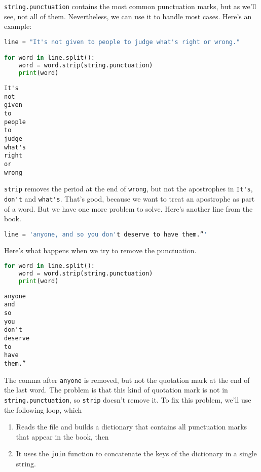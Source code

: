 \passthrough{\lstinline!string.punctuation!} contains the most common
punctuation marks, but as we'll see, not all of them. Nevertheless, we
can use it to handle most cases. Here's an example:

\begin{lstlisting}[language=Python,style=source]
line = "It's not given to people to judge what's right or wrong."

for word in line.split():
    word = word.strip(string.punctuation)
    print(word)
\end{lstlisting}

\begin{lstlisting}[style=output]
It's
not
given
to
people
to
judge
what's
right
or
wrong
\end{lstlisting}

\passthrough{\lstinline!strip!} removes the period at the end of
\passthrough{\lstinline!wrong!}, but not the apostrophes in
\passthrough{\lstinline!It's!}, \passthrough{\lstinline!don't!} and
\passthrough{\lstinline!what's!}. That's good, because we want to treat
an apostrophe as part of a word.
But we have one more problem to solve. Here's another line from the book.

\begin{lstlisting}[language=Python,style=source]
line = 'anyone, and so you don't deserve to have them.”'
\end{lstlisting}

Here's what happens when we try to remove the punctuation.

\begin{lstlisting}[language=Python,style=source]
for word in line.split():
    word = word.strip(string.punctuation)
    print(word)
\end{lstlisting}

\begin{lstlisting}[style=output]
anyone
and
so
you
don't
deserve
to
have
them.”
\end{lstlisting}

The comma after \passthrough{\lstinline!anyone!} is removed, but not the
quotation mark at the end of the last word.
The problem is that this kind of quotation mark is not in
\passthrough{\lstinline!string.punctuation!}, so
\passthrough{\lstinline!strip!} doesn't remove it. To fix this problem,
we'll use the following loop, which

\begin{enumerate}
\def\labelenumi{\arabic{enumi}.}
\item
  Reads the file and builds a dictionary that contains all punctuation
  marks that appear in the book, then
\item
  It uses the \passthrough{\lstinline!join!} function to concatenate the
  keys of the dictionary in a single string.
\end{enumerate}

